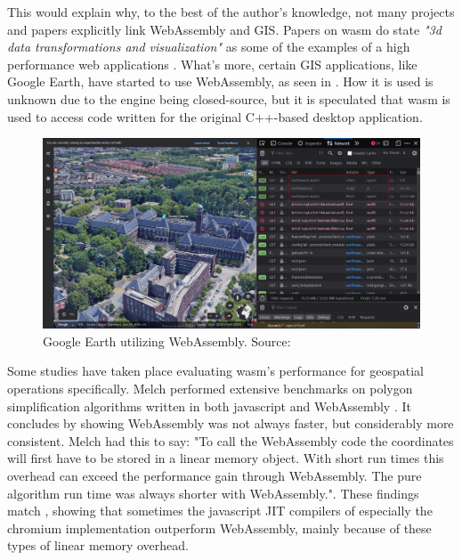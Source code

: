 This would explain why, to the best of the author's knowledge, not many projects and papers explicitly link WebAssembly and GIS. Papers on \ac{wasm} do state \textit{"3d data transformations and visualization"} as some of the examples of a high performance web applications \cite{haas_bringing_2017, jangda_not_2019}. What's more, certain GIS applications, like Google Earth, have started to use WebAssembly, as seen in  \cite{google_google_2020}. How it is used is unknown due to the engine being closed-source, but it is speculated that \ac{wasm} is used to access code written for the original C++-based desktop application.

\begin{figure}[!tbp]
  \centering
  \begin{minipage}[b]{0.80\textwidth}
    \includegraphics[width=\textwidth]{../images/google-earth-uses-webassembly.PNG}
    \caption{Google Earth utilizing WebAssembly. Source: \cite{google_google_2020}}
    \label{fig:google-earth}
  \end{minipage}
\end{figure}

Some studies have taken place evaluating \ac{wasm}'s performance for geospatial operations specifically. Melch performed extensive benchmarks on polygon simplification algorithms written in both javascript and WebAssembly \cite{melch_performance_2019}. It concludes by showing WebAssembly was not always faster, but considerably more consistent. Melch had this to say: "To call the WebAssembly code the coordinates will first have to be stored in a linear memory object. With short run times this overhead can exceed the performance gain through WebAssembly. The pure algorithm run time was always shorter with WebAssembly.". These findings match \cite{jangda_not_2019}, showing that sometimes the javascript JIT compilers of especially the chromium implementation outperform WebAssembly, mainly because of these types of linear memory overhead.

